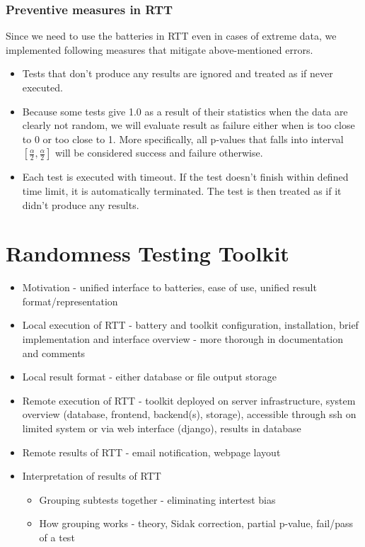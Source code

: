 \documentclass[
  digital,  	%
  color,		%
  oneside,   	%
  12pt,
  nocover,
  notable,
  nolof,
  nolot,
]{fithesis3}
\begin{document}
\subsection{Preventive measures in RTT}
Since we need to use the batteries in RTT even in cases of extreme data, we implemented following measures that mitigate above-mentioned errors.
\begin{itemize}
\item Tests that don't produce any results are ignored and treated as if never executed.
\item Because some tests give 1.0 as a result of their statistics when the data are clearly not random, we will evaluate result as failure either when is too close to 0 or too close to 1. More specifically, all p-values that falls into interval $\left[\frac{\alpha}{2}, \frac{\alpha}{2}\right]$ will be considered success and failure otherwise.
\item Each test is executed with timeout. If the test doesn't finish within defined time limit, it is automatically terminated. The test is then treated as if it didn't produce any results.
\end{itemize}

\chapter{Randomness Testing Toolkit}
\begin{itemize}
\item Motivation - unified interface to batteries, ease of use, unified result format/representation
\item Local execution of RTT - battery and toolkit configuration, installation, brief implementation and interface overview - more thorough in documentation and comments
\item Local result format - either database or file output storage
\item Remote execution of RTT - toolkit deployed on server infrastructure, system overview (database, frontend, backend(s), storage), accessible through ssh on limited system or via web interface (django), results in database
\item Remote results of RTT - email notification, webpage layout
\item Interpretation of results of RTT
\begin{itemize}
\item Grouping subtests together - eliminating intertest bias
\item How grouping works - theory, Sidak correction, partial p-value, fail/pass of a test
\end{itemize}
\end{itemize}
 
\end{document}
